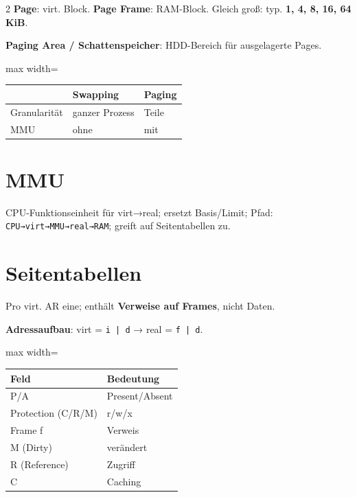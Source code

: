 \documentclass[10pt, a4paper]{article}
\begin{document}
\begin{multicols}{2}
\textbf{Page}: virt. Block. \textbf{Page Frame}: RAM-Block. Gleich groß: typ. \textbf{1, 4, 8, 16, 64 KiB}.


\textbf{Paging Area / Schattenspeicher}: HDD-Bereich für ausgelagerte Pages.



{\small
\begin{adjustbox}{max width=\linewidth}
{\scriptsize
\begin{tabular}{lll}
\toprule
\textbf{} & \textbf{Swapping} & \textbf{Paging} \\
\midrule
Granularität & ganzer Prozess & Teile \\
MMU & ohne & mit \\
\bottomrule
\end{tabular}
}
\end{adjustbox}
}



\section{MMU}

CPU-Funktionseinheit für virt→real; ersetzt Basis/Limit; Pfad: \texttt{CPU→virt→MMU→real→RAM}; greift auf Seitentabellen zu.



\section{Seitentabellen}

Pro virt. AR eine; enthält \textbf{Verweise auf Frames}, nicht Daten.


\textbf{Adressaufbau}: virt = \texttt{i | d} → real = \texttt{f | d}.



{\small
\begin{adjustbox}{max width=\linewidth}
{\scriptsize
\begin{tabular}{ll}
\toprule
\textbf{Feld} & \textbf{Bedeutung} \\
\midrule
P/A & Present/Absent \\
Protection (C/R/M) & r/w/x \\
Frame f & Verweis \\
M (Dirty) & verändert \\
R (Reference) & Zugriff \\
C & Caching \\
\bottomrule
\end{tabular}
}
\end{adjustbox}
}




\end{multicols}
\end{document}
